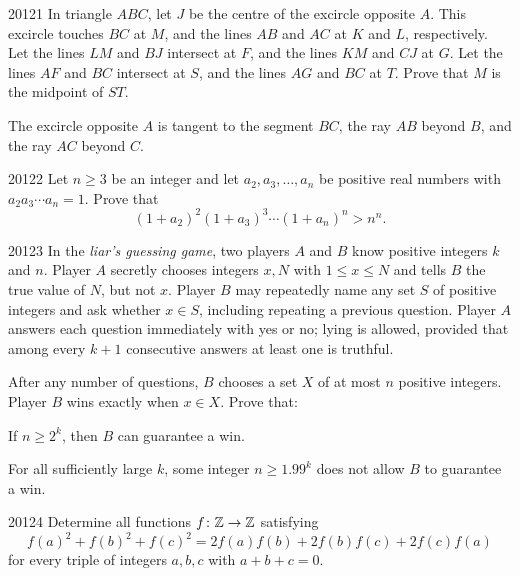 
\begin{problem}{2012}{1}
In triangle $ABC$, let $J$ be the centre of the excircle opposite $A$. This excircle touches $BC$ at $M$, and the lines $AB$ and $AC$ at $K$ and $L$, respectively. Let the lines $LM$ and $BJ$ intersect at $F$, and the lines $KM$ and $CJ$ at $G$. Let the lines $AF$ and $BC$ intersect at $S$, and the lines $AG$ and $BC$ at $T$. Prove that $M$ is the midpoint of $ST$.

The excircle opposite $A$ is tangent to the segment $BC$, the ray $AB$ beyond $B$, and the ray $AC$ beyond $C$.
\end{problem}

\begin{problem}{2012}{2}
Let $n\geq3$ be an integer and let $a_2, a_3, \dots, a_n$ be positive real numbers with $a_2a_3\cdots a_n=1$. Prove that
\[
    (1+a_2)^2(1+a_3)^3\cdots(1+a_n)^n>n^n.
\]
\end{problem}

\begin{problem}{2012}{3}
In the \emph{liar's guessing game}, two players $A$ and $B$ know positive integers $k$ and $n$. Player $A$ secretly chooses integers $x, N$ with $1\leq x\leq N$ and tells $B$ the true value of $N$, but not $x$. Player $B$ may repeatedly name any set $S$ of positive integers and ask whether $x\in S$, including repeating a previous question. Player $A$ answers each question immediately with yes or no; lying is allowed, provided that among every $k+1$ consecutive answers at least one is truthful.

After any number of questions, $B$ chooses a set $X$ of at most $n$ positive integers. Player $B$ wins exactly when $x\in X$. Prove that:
\begin{problemsubparts}
    \item If $n\geq2^k$, then $B$ can guarantee a win.
    \item For all sufficiently large $k$, some integer $n\geq1.99^k$ does not allow $B$ to guarantee a win.
\end{problemsubparts}
\end{problem}

\begin{problem}{2012}{4}
Determine all functions $f\colon\mathbb{Z}\to\mathbb{Z}$ satisfying
\[
    f(a)^2+f(b)^2+f(c)^2
    =2f(a)f(b)+2f(b)f(c)+2f(c)f(a)
\]
for every triple of integers $a, b, c$ with $a+b+c=0$.
\end{problem}

